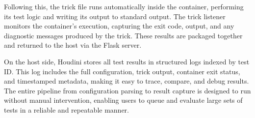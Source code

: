 \documentclass[12pt]{report}
\begin{document}
\begin{doublespace}
Following this, the trick file runs automatically inside the container, performing its test logic and writing its output to standard output. The trick listener monitors the container’s execution, capturing the exit code, output, and any diagnostic messages produced by the trick. These results are packaged together and returned to the host via the Flask server.

On the host side, Houdini stores all test results in structured logs indexed by test ID. This log includes the full configuration, trick output, container exit status, and timestamped metadata, making it easy to trace, compare, and debug results. The entire pipeline from configuration parsing to result capture is designed to run without manual intervention, enabling users to queue and evaluate large sets of tests in a reliable and repeatable manner.

\end{doublespace} 	\fontsize{12pt}{14pt} \selectfont
\end{document}
